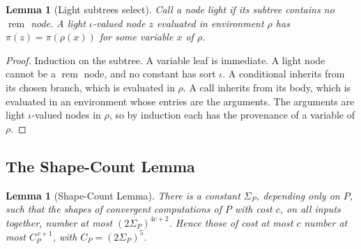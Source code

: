 \documentclass[11pt]{article}
\newtheorem{lemma}[theorem]{Lemma}
\theoremstyle{remark}
\newcommand{\rem}{\operatorname{rem}}
\begin{document}
\begin{lemma}[Light subtrees select]\label{lem:light}
Call a node \emph{light} if its subtree contains no $\rem$ node. A light
$\iota$-valued node $z$ evaluated in environment $\rho$ has
$\pi(z)=\pi(\rho(x))$ for some variable $x$ of $\rho$.
\end{lemma}

\begin{proof}
Induction on the subtree. A variable leaf is immediate. A light node cannot
be a $\rem$ node, and no constant has sort $\iota$. A conditional inherits
from its chosen branch, which is evaluated in $\rho$. A call inherits from its
body, which is evaluated in an environment whose entries are the arguments.
The arguments are light $\iota$-valued nodes in $\rho$, so by induction each
has the provenance of a variable of $\rho$.
\end{proof}

\subsection{The Shape-Count Lemma}

\begin{lemma}[Shape-Count Lemma]\label{lem:count}
There is a constant $\Sigma_P$, depending only on $P$, such that the shapes of
convergent computations of $P$ with cost $c$, on all inputs together, number
at most $(2\Sigma_P)^{4c+2}$. Hence those of cost at most $c$ number at most
$C_P^{\,c+1}$, with $C_P=(2\Sigma_P)^5$.
\end{lemma}
\end{document}
